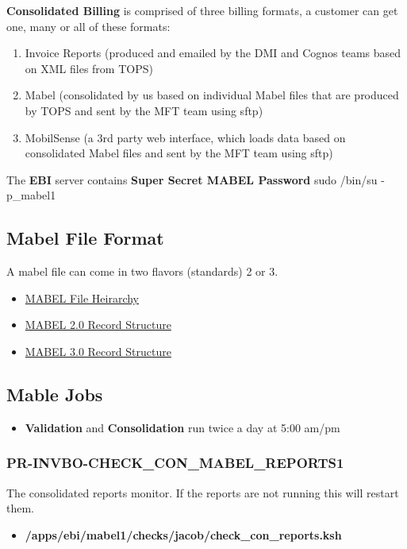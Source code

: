 \documentclass[12pt,twoside]{article}
\begin{document}
\textbf{Consolidated Billing} is comprised of three billing formats, a customer can get one, many or all of these formats:
\begin{enumerate}
\item Invoice Reports (produced and emailed by the DMI and Cognos teams based on XML files from TOPS)
\item Mabel (consolidated by us based on individual Mabel files that are produced by TOPS and sent by the MFT team using sftp)
\item MobilSense (a 3rd party web interface, which loads data based on consolidated Mabel files and sent by the MFT team using sftp)
\end{enumerate}

The \textbf{EBI} server contains 
\textbf{Super Secret MABEL Password} sudo /bin/su - p\_mabel1
\subsection{Mabel File Format}
\label{sec:orgheadline44}
A mabel file can  come in two flavors (standards) 2 or 3. 
\begin{itemize}
\item \href{docs/MABEL\%20Hierarchy.pdf}{MABEL File Heirarchy}
\item \href{docs/Mable2_record_structure_C07.pdf}{MABEL 2.0 Record Structure}
\item \href{docs/Mabel3_record_structure_CH07.pdf}{MABEL 3.0 Record Structure}
\end{itemize}
\subsection{Mable Jobs}
\label{sec:orgheadline53}
\begin{itemize}
\item \textbf{Validation} and \textbf{Consolidation} run twice a day at 5:00 am/pm
\end{itemize}
\small
\subsubsection{PR-INVBO-CHECK\_CON\_MABEL\_REPORTS1}
\label{sec:orgheadline45}
The consolidated reports monitor. If the reports are not running this will restart them.
\begin{itemize}
\item \textbf{/apps/ebi/mabel1/checks/jacob/check\_con\_reports.ksh}
\end{itemize}
\end{document}
